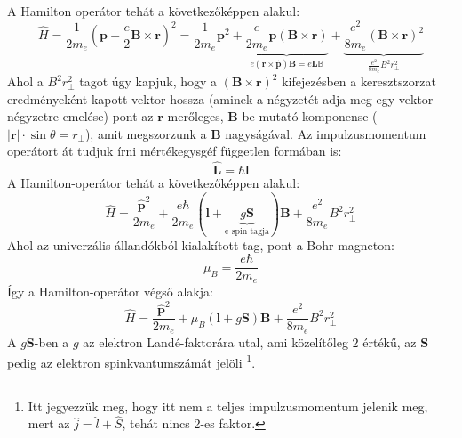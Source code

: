\documentclass[../main.tex]{subfiles}
\begin{document}
A Hamilton operátor tehát a következőképpen alakul:
\begin{equation}
    \hat{H} = \frac{1}{2m_e} \left(\mathbf{p} + \frac{e}{2} \mathbf{B} \times \mathbf{r} \right)^2 = \frac{1}{2m_e}\mathbf{p}^2 + \underbrace{\frac{e}{2m_e} \mathbf{p} \left(\mathbf{B} \times \mathbf{r}\right)}_{e(\mathbf{r} \times \hat{\mathbf{p}})\mathbf{B} = e \mathbf{L} \mathbb{B}} +\underbrace{\frac{e^2}{8m_e} \left(\mathbf{B} \times \mathbf{r}\right)^2}_{\frac{e^2}{8m_e} B^2 r^2_\perp}
\end{equation}
Ahol a $B^2 r^2_\perp$ tagot úgy kapjuk, hogy a $\left(\mathbf{B} \times \mathbf{r}\right)^2$ kifejezésben a keresztszorzat eredményeként kapott vektor hossza (aminek a négyzetét adja meg egy vektor négyzetre emelése)
pont az $\mathbf{r}$ merőleges, $\mathbf{B}$-be mutató komponense ($|\mathbf{r}| \cdot \sin \theta = r_\perp$), amit megszorzunk a $\mathbf{B}$ nagyságával. Az impulzusmomentum operátort át tudjuk írni
mértékegysgéf független formában is:
\begin{equation}
    \hat{\mathbf{L}} = \hbar \mathbf{l}
\end{equation}
A Hamilton-operátor tehát a következőképpen alakul:
\begin{equation}
    \hat{H} = \frac{\hat{\mathbf{p}}^2}{2m_e} + \frac{e \hbar}{2 m_e}\left(\mathbf{l} + \underbrace{g \mathbf{S}}_{\text{e spin tagja}}\right)\mathbf{B} + \frac{e^2}{8m_e} B^2 r^2_\perp
\end{equation}
Ahol az univerzális állandókból kialakított tag, pont a Bohr-magneton:
\begin{equation}
    \mu_B = \frac{e \hbar}{2 m_e}
\end{equation}
Így a Hamilton-operátor végső alakja:
\begin{equation}
   \boxed{\hat{H} = \frac{\hat{\mathbf{p}}^2}{2m_e} + \mu_B \left(\mathbf{l} + g \mathbf{S}\right) \mathbf{B} + \frac{e^2}{8m_e} B^2 r^2_\perp}
\end{equation}
A $g \mathbf{S}$-ben a $g$ az elektron Landé-faktorára utal, ami közelítőleg $2$ értékű, az $\mathbf{S}$ pedig az elektron spinkvantumszámát jelöli
\footnote{
    Itt jegyezzük meg, hogy itt nem a teljes impulzusmomentum jelenik meg, mert az $\hat{j} = \hat{l} + \hat{S}$, tehát nincs 2-es faktor. 
}.
\end{document}
